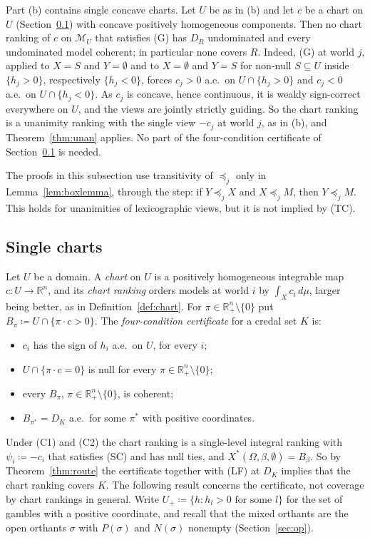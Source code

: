 \documentclass[11pt]{article}
\newcommand{\R}{\mathbb{R}}
\newcommand{\M}{\mathcal{M}}
\theoremstyle{plain}
\theoremstyle{definition}
\theoremstyle{remark}
\begin{document}
Part (b) contains single concave charts. Let $U$ be as in (b) and let $c$ be a chart on
$U$ (Section~\ref{sec:excl-chart}) with concave positively homogeneous components. Then no
chart ranking of $c$ on $\M_U$ that satisfies (G) has $D_R$ undominated and every
undominated model coherent; in particular none covers $R$. Indeed, (G) at world $j$,
applied to $X=S$ and $Y=\emptyset$ and to $X=\emptyset$ and $Y=S$ for non-null $S\subseteq
U$ inside $\{h_j>0\}$, respectively $\{h_j<0\}$, forces $c_j>0$ a.e.\ on $U\cap\{h_j>0\}$
and $c_j<0$ a.e.\ on $U\cap\{h_j<0\}$. As $c_j$ is concave, hence continuous, it is weakly
sign-correct everywhere on $U$, and the views are jointly strictly guiding. So the chart
ranking is a unanimity ranking with the single view $-c_j$ at world $j$, as in (b), and
Theorem~\ref{thm:unan} applies. No part of the four-condition certificate of
Section~\ref{sec:excl-chart} is needed.

The proofs in this subsection use transitivity of $\preceq_j$ only in
Lemma~\ref{lem:boxlemma}, through the step: if $Y\preceq_jX$ and $X\preceq_jM$, then
$Y\preceq_jM$. This holds for unanimities of lexicographic views, but it is not implied by
(TC).

\subsection{Single charts}\label{sec:excl-chart}

Let $U$ be a domain. A \emph{chart} on $U$ is a positively homogeneous integrable map
$c:U\to\R^n$, and its \emph{chart ranking} orders models at world $i$ by $\int_Xc_i\,d\mu$,
larger being better, as in Definition~\ref{def:chart}. For $\pi\in\R^n_+\setminus\{0\}$
put $B_\pi\coloneqq U\cap\{\pi\cdot c>0\}$. The \emph{four-condition certificate} for a
credal set $K$ is:
\begin{itemize}
  \item[(C1)] $c_i$ has the sign of $h_i$ a.e.\ on $U$, for every $i$;
  \item[(C2)] $U\cap\{\pi\cdot c=0\}$ is null for every $\pi\in\R^n_+\setminus\{0\}$;
  \item[(C3)] every $B_\pi$, $\pi\in\R^n_+\setminus\{0\}$, is coherent;
  \item[(C4)] $B_{\pi^\ast}=D_K$ a.e.\ for some $\pi^\ast$ with positive coordinates.
\end{itemize}
Under (C1) and (C2) the chart ranking is a single-level integral ranking with
$\psi_i\coloneqq-c_i$ that satisfies (SC) and has null ties, and $X^\ast(\Omega,\beta,
\emptyset)=B_\beta$. So by Theorem~\ref{thm:route} the certificate together with (LF) at
$D_K$ implies that the chart ranking covers $K$. The following result concerns the
certificate, not coverage by chart rankings in general. Write $U_+\coloneqq\{h:h_l>0
\text{ for some }l\}$ for the set of gambles with a positive coordinate, and recall that
the mixed orthants are the open orthants $\sigma$ with $P(\sigma)$ and $N(\sigma)$
nonempty (Section~\ref{sec:op}).
\end{document}

